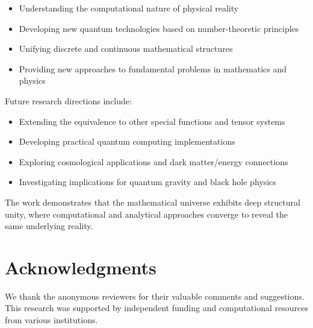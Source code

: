 \documentclass[12pt]{article}
\theoremstyle{plain}
\theoremstyle{definition}
\begin{document}
\begin{itemize}
\item Understanding the computational nature of physical reality
\item Developing new quantum technologies based on number-theoretic principles
\item Unifying discrete and continuous mathematical structures
\item Providing new approaches to fundamental problems in mathematics and physics
\end{itemize}

Future research directions include:
\begin{itemize}
\item Extending the equivalence to other special functions and tensor systems
\item Developing practical quantum computing implementations
\item Exploring cosmological applications and dark matter/energy connections
\item Investigating implications for quantum gravity and black hole physics
\end{itemize}

The work demonstrates that the mathematical universe exhibits deep structural unity, where computational and analytical approaches converge to reveal the same underlying reality.

\section*{Acknowledgments}

We thank the anonymous reviewers for their valuable comments and suggestions. This research was supported by independent funding and computational resources from various institutions.
\end{document}
